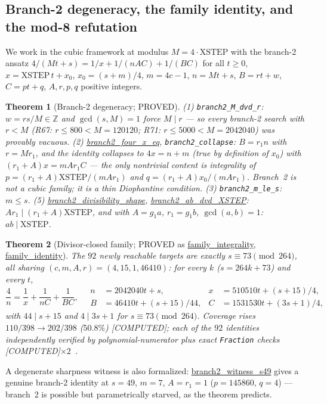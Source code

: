 \documentclass[11pt,a4paper]{article}
\newtheorem{theorem}{Theorem}
\theoremstyle{definition}
\begin{document}
\subsection{Branch-2 degeneracy, the family identity, and the mod-8 refutation}

We work in the cubic framework at modulus $M=4\cdot\mathrm{XSTEP}$ with
the branch-2 ansatz $4/(Mt+s)=1/x+1/(nAC)+1/(BC)$ for all $t\ge0$,
$x=\mathrm{XSTEP}\,t+x_0$, $x_0=(s+m)/4$, $m=4c-1$, $n=Mt+s$,
$B=rt+w$, $C=pt+q$, $A,r,p,q$ positive integers.

\begin{theorem}[Branch-2 degeneracy; PROVED]
  \label{thm:branch2}
  (1) \texttt{branch2\_M\_dvd\_r}: $w=rs/M\in\mathbb{Z}$ and
  $\gcd(s,M)=1$ force $M\mid r$ --- so every branch-2 search with
  $r<M$ (R67: $r\le800<M=120120$; R71: $r\le5000<M=2042040$) was
  provably vacuous. (2) \url{branch2_four_x_eq},
  \texttt{branch2\_collapse}: $B=r_1n$ with $r=Mr_1$, and the identity
  collapses to $4x=n+m$ (true by definition of $x_0$) with
  $(r_1+A)x=mAr_1C$ --- the only nontrivial content is integrality of
  $p=(r_1+A)\mathrm{XSTEP}/(mAr_1)$ and $q=(r_1+A)x_0/(mAr_1)$.
  Branch~2 is not a cubic family; it is a thin Diophantine condition.
  (3) \texttt{branch2\_m\_le\_s}: $m\le s$. (5)
  \url{branch2_divisibility_shape}, \url{branch2_ab_dvd_XSTEP}:
  $Ar_1\mid(r_1+A)\mathrm{XSTEP}$, and with $A=g_1a$, $r_1=g_1b$,
  $\gcd(a,b)=1$: $ab\mid\mathrm{XSTEP}$.
\end{theorem}

\begin{theorem}[Divisor-closed family; PROVED as
  \url{family_integrality}, \url{family_identity}]
  \label{thm:family}
  The $92$ newly reachable targets are exactly $s\equiv73\pmod{264}$,
  all sharing $(c,m,A,r)=(4,15,1,46410)$: for every $k$
  ($s=264k+73$) and every $t$,
  \begin{equation}
    \label{eq:family}
    \frac{4}{n}=\frac1x+\frac1{nC}+\frac1{BC},\quad
    \begin{aligned}
      n&=2042040t+s, & x&=510510t+(s+15)/4,\\
      B&=46410t+(s+15)/44, & C&=1531530t+(3s+1)/4,
    \end{aligned}
  \end{equation}
  with $44\mid s+15$ and $4\mid3s+1$ for $s\equiv73\pmod{264}$. Coverage
  rises $110/398\to202/398$ ($50.8\%$) [COMPUTED]; each of the $92$
  identities independently verified by polynomial-numerator plus exact
  \texttt{Fraction} checks [COMPUTED]$\times2$~\cite{D209}.
\end{theorem}
A degenerate sharpness witness is also formalized:
\url{branch2_witness_s49} gives a genuine branch-2 identity at
$s=49$, $m=7$, $A=r_1=1$ ($p=145860$, $q=4$) --- branch~2 is possible but
parametrically starved, as the theorem predicts.
\end{document}
